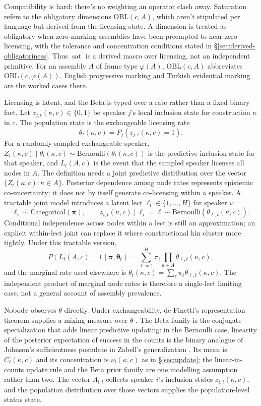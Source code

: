Compatibility is hard: there's no weighting an operator clash away. Saturation
refers to the obligatory dimensions $\mathrm{OBL}(c,A)$, which aren't stipulated
per language but derived from the licensing state. A dimension is treated as
obligatory when zero-marking assemblies have been preempted to near-zero
licensing, with the tolerance and concentration conditions stated in
\S\ref{sec:derived-obligatoriness}. Thus
$\operatorname{sat}$ is a derived macro over licensing, not an independent
primitive. For an assembly $A$ of frame type $\varphi(A)$, $\mathrm{OBL}(c,A)$
abbreviates $\mathrm{OBL}(c,\varphi(A))$. English progressive marking and
Turkish evidential marking are the worked cases there.

Licensing is latent, and the Beta is typed over a rate rather than a fixed binary
fact. Let $z_{j,t}(\kappa,c)\in\{0,1\}$ be speaker $j$'s local inclusion state
for construction $\kappa$ in $c$. The population state is the exchangeable
licensing rate
\[
\theta_t(\kappa,c)=P_j\!\left(z_{j,t}(\kappa,c)=1\right).
\]
For a randomly sampled exchangeable speaker,
$Z_t(\kappa,c)\mid\theta_t(\kappa,c)\sim
\mathrm{Bernoulli}(\theta_t(\kappa,c))$ is the predictive inclusion state for
that speaker, and $L_t(A,c)$ is the event that the sampled speaker licenses all
nodes in $A$. The definition needs a joint predictive distribution
over the vector $\{Z_t(\kappa,c):\kappa\in A\}$. Posterior dependence among
node rates represents epistemic co-uncertainty; it does not by itself generate
co-licensing within a speaker. A tractable joint model introduces a latent lect
$\ell_i\in\{1,\ldots,H\}$ for speaker $i$:
\[
\ell_i\sim\mathrm{Categorical}(\boldsymbol{\pi}),\qquad
z_{i,t}(\kappa,c)\mid\ell_i=\ell\sim
\mathrm{Bernoulli}\!\left(\theta_{\ell,t}(\kappa,c)\right).
\]
Conditional independence across nodes within a lect is still an approximation;
an explicit within-lect joint can replace it where constructional kin cluster
more tightly. Under this tractable version,
\[
P\!\left(L_t(A,c)=1\mid\boldsymbol{\pi},\boldsymbol{\theta}_t\right)=
\sum_{\ell=1}^{H}\pi_\ell\prod_{\kappa\in A}
\theta_{\ell,t}(\kappa,c),
\]
and the marginal rate used elsewhere is
$\theta_t(\kappa,c)=\sum_\ell\pi_\ell\theta_{\ell,t}(\kappa,c)$. The
independent product of marginal node rates is therefore a single-lect limiting
case, not a general account of assembly prevalence.

Nobody observes $\theta$ directly. Under exchangeability, de Finetti's
representation theorem supplies a mixing measure over $\theta$
\parencite{deFinetti1937}. The Beta family is the conjugate specialization
that adds linear predictive updating: in the Bernoulli case, linearity of the
posterior expectation of success in the counts is the binary analogue of
Johnson's sufficientness postulate in Zabell's generalization
\parencite{zabell1982}. Its mean is $C_t(\kappa,c)$ and its
concentration is $\nu_t(\kappa,c)$ as in \S\ref{sec:update}; the linear-in-counts
update rule and the Beta prior family are one modelling assumption rather than
two. The vector $\Lambda_{i,t}$ collects speaker $i$'s inclusion states
$z_{i,t}(\kappa,c)$, and the population distribution over those vectors supplies
the population-level status state.

